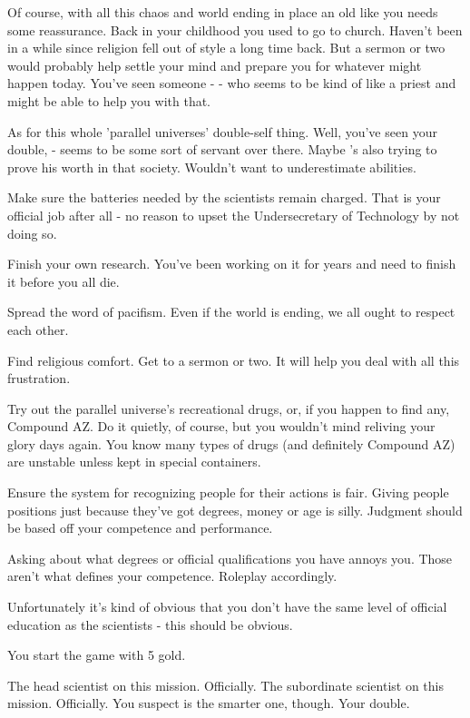 \documentclass[char]{guildcamp3}
\begin{document}
Of course, with all this chaos and world ending in place an old \cTech{\human} like you needs some reassurance. Back in your childhood you used to go to church. Haven't been in a while since religion fell out of style a long time back. But a sermon or two would probably help settle your mind and prepare you for whatever might happen today. You've seen someone - \cPaladin{\intro} - who seems to be kind of like a priest and might be able to help you with that. 

As for this whole 'parallel universes' double-self thing. Well, you've seen your double, \cServant{\intro} - seems to be some sort of servant over there. Maybe \cServant{\they}'s also trying to prove his worth in that society. Wouldn't want to underestimate \cServant{\their} abilities.


\begin{itemz}[Goals]
  \item Make sure the batteries needed by the scientists remain charged. That is your official job after all - no reason to upset the Undersecretary of Technology by not doing so. 
  \item Finish your own research. You've been working on it for years and need to finish it before you all die.
  \item Spread the word of pacifism. Even if the world is ending, we all ought to respect each other.
  \item Find religious comfort. Get to a sermon or two. It will help you deal with all this frustration.
  \item Try out the parallel universe's recreational drugs, or, if you happen to find any, Compound AZ. Do it quietly, of course, but you wouldn't mind reliving your glory days again. You know many types of drugs (and definitely Compound AZ) are unstable unless kept in special containers.
  \item Ensure the system for recognizing people for their actions is fair. Giving people positions just because they've got degrees, money or age is silly. Judgment should be based off your competence and performance. 
\end{itemz}

\begin{itemz}[Notes]
  \item Asking about what degrees or official qualifications you have annoys you. Those aren't what defines your competence. Roleplay accordingly.  
  \item Unfortunately it's kind of obvious that you don't have the same level of official education as the scientists - this should be obvious.  
  \item You start the game with 5 gold. 
\end{itemz}


\begin{contacts}
  \contact{\cSciOne{}} The head scientist on this mission. Officially. 
  \contact{\cSciTwo{}} The subordinate scientist on this mission. Officially. You suspect \cSciTwo{} is the smarter one, though.
  \contact{\cServant{}} Your double. 
\end{contacts}
\end{document}
